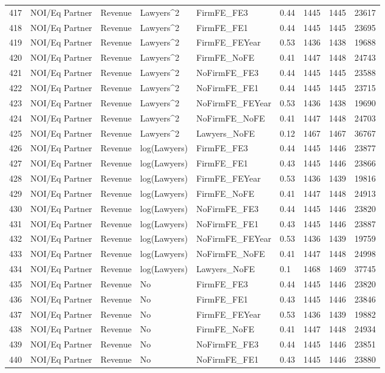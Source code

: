 \documentclass{article}
\begin{document}
\begin{table}[H]
\begin{tabular}{rllllllll}
  417 & NOI/Eq Partner & Revenue & Lawyers^2 & FirmFE\_FE3 & 0.44 & 1445 & 1445 & 23617 \\ 
  418 & NOI/Eq Partner & Revenue & Lawyers^2 & FirmFE\_FE1 & 0.44 & 1445 & 1445 & 23695 \\ 
  419 & NOI/Eq Partner & Revenue & Lawyers^2 & FirmFE\_FEYear & 0.53 & 1436 & 1438 & 19688 \\ 
  420 & NOI/Eq Partner & Revenue & Lawyers^2 & FirmFE\_NoFE & 0.41 & 1447 & 1448 & 24743 \\ 
  421 & NOI/Eq Partner & Revenue & Lawyers^2 & NoFirmFE\_FE3 & 0.44 & 1445 & 1445 & 23588 \\ 
  422 & NOI/Eq Partner & Revenue & Lawyers^2 & NoFirmFE\_FE1 & 0.44 & 1445 & 1445 & 23715 \\ 
  423 & NOI/Eq Partner & Revenue & Lawyers^2 & NoFirmFE\_FEYear & 0.53 & 1436 & 1438 & 19690 \\ 
  424 & NOI/Eq Partner & Revenue & Lawyers^2 & NoFirmFE\_NoFE & 0.41 & 1447 & 1448 & 24703 \\ 
  425 & NOI/Eq Partner & Revenue & Lawyers^2 & Lawyers\_NoFE & 0.12 & 1467 & 1467 & 36767 \\ 
  426 & NOI/Eq Partner & Revenue & log(Lawyers) & FirmFE\_FE3 & 0.44 & 1445 & 1446 & 23877 \\ 
  427 & NOI/Eq Partner & Revenue & log(Lawyers) & FirmFE\_FE1 & 0.43 & 1445 & 1446 & 23866 \\ 
  428 & NOI/Eq Partner & Revenue & log(Lawyers) & FirmFE\_FEYear & 0.53 & 1436 & 1439 & 19816 \\ 
  429 & NOI/Eq Partner & Revenue & log(Lawyers) & FirmFE\_NoFE & 0.41 & 1447 & 1448 & 24913 \\ 
  430 & NOI/Eq Partner & Revenue & log(Lawyers) & NoFirmFE\_FE3 & 0.44 & 1445 & 1446 & 23820 \\ 
  431 & NOI/Eq Partner & Revenue & log(Lawyers) & NoFirmFE\_FE1 & 0.43 & 1445 & 1446 & 23887 \\ 
  432 & NOI/Eq Partner & Revenue & log(Lawyers) & NoFirmFE\_FEYear & 0.53 & 1436 & 1439 & 19759 \\ 
  433 & NOI/Eq Partner & Revenue & log(Lawyers) & NoFirmFE\_NoFE & 0.41 & 1447 & 1448 & 24998 \\ 
  434 & NOI/Eq Partner & Revenue & log(Lawyers) & Lawyers\_NoFE & 0.1 & 1468 & 1469 & 37745 \\ 
  435 & NOI/Eq Partner & Revenue & No & FirmFE\_FE3 & 0.44 & 1445 & 1446 & 23820 \\ 
  436 & NOI/Eq Partner & Revenue & No & FirmFE\_FE1 & 0.43 & 1445 & 1446 & 23846 \\ 
  437 & NOI/Eq Partner & Revenue & No & FirmFE\_FEYear & 0.53 & 1436 & 1439 & 19882 \\ 
  438 & NOI/Eq Partner & Revenue & No & FirmFE\_NoFE & 0.41 & 1447 & 1448 & 24934 \\ 
  439 & NOI/Eq Partner & Revenue & No & NoFirmFE\_FE3 & 0.44 & 1445 & 1446 & 23851 \\ 
  440 & NOI/Eq Partner & Revenue & No & NoFirmFE\_FE1 & 0.43 & 1445 & 1446 & 23880 \\ 
   \hline
\end{tabular}
\end{table}
\end{document}
